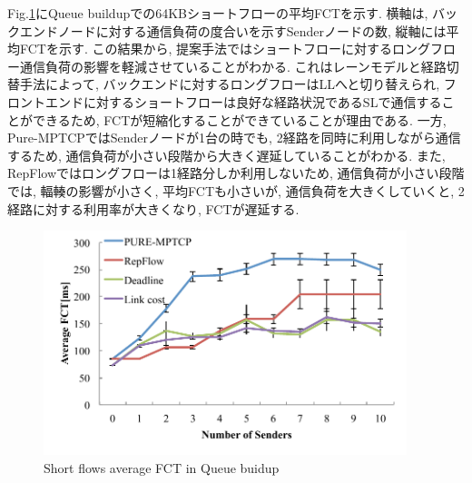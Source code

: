 Fig.\ref{fig:eval2_aver}にQueue buildupでの64KBショートフローの平均FCTを示す. 
横軸は, バックエンドノードに対する通信負荷の度合いを示すSenderノードの数, 縦軸には平均FCTを示す. 
この結果から, 提案手法ではショートフローに対するロングフロー通信負荷の影響を軽減させていることがわかる. 
これはレーンモデルと経路切替手法によって, バックエンドに対するロングフローはLLへと切り替えられ,
フロントエンドに対するショートフローは良好な経路状況であるSLで通信することができるため, FCTが短縮化することができていることが理由である. 
一方,  Pure-MPTCPではSenderノードが1台の時でも, 2経路を同時に利用しながら通信するため,
通信負荷が小さい段階から大きく遅延していることがわかる. 
また, RepFlowではロングフローは1経路分しか利用しないため, 通信負荷が小さい段階では, 輻輳の影響が小さく, 平均FCTも小さいが,
通信負荷を大きくしていくと, 2経路に対する利用率が大きくなり, FCTが遅延する. 

\begin{figure}[t]
    \begin{center}
    \includegraphics[autoebb, width=300pt]{./img/eval2_avr.pdf}
    \caption{Short flows average FCT in Queue buidup}
    \label{fig:eval2_aver}
    \end{center}
\end{figure}

